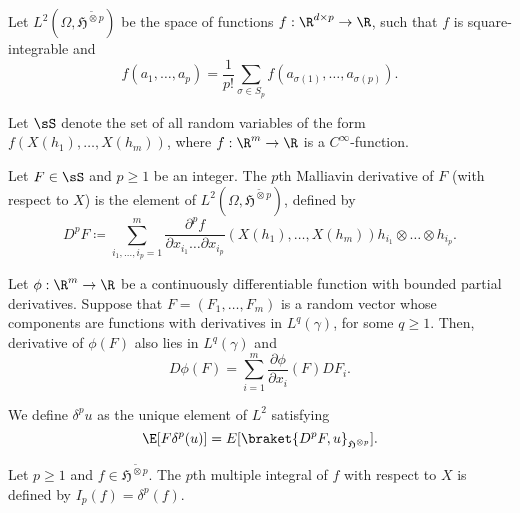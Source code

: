 \begin{definition}
    Let \(L^2(\Omega, \mathfrak{H}^{\tilde \otimes p})\) be the space of functions \(f: \R^{d \times p} \to \R\), such that \(f\) is square-integrable and
    \begin{equation}
        f(a_1, \ldots, a_p) = \frac{1}{p!} \sum_{\sigma \in S_p} f(a_{\sigma(1)}, \ldots, a_{\sigma(p)}).
    \end{equation}
\end{definition}
Let \(\sS\) denote the set of all random variables of the form \(f(X(h_1), \ldots, X(h_m))\),
where \(f: \R^{m} \to \R\) is a \(C^{\infty}\)-function. 
\begin{definition}
    Let \(F \in \sS\) and \(p \geq 1\) be an integer. The \(p\)th Malliavin derivative of \(F\) (with respect to \(X\))
    is the element of \(L^2(\Omega, \mathfrak{H}^{\tilde \otimes p})\), defined by
    \begin{equation}
        D^p F \coloneqq \sum_{i_1, \ldots, i_p = 1}^{m} \frac{\partial^p f}{\partial x_{i_1} \ldots \partial x_{i_p}} (X(h_1), \ldots, X(h_m)) h_{i_1} \otimes \ldots \otimes h_{i_p}.
    \end{equation}
\end{definition}
\begin{proposition}
    Let \(\phi: \R^m \to \R\) be a continuously differentiable function with bounded partial derivatives.
    Suppose that \(F = (F_1, \ldots, F_m)\) is a random vector whose components are functions with derivatives in \(L^q(\gamma)\), for some \(q \geq 1\).
    Then, derivative of \(\phi(F)\) also lies in \(L^q(\gamma)\) and
    \begin{equation}
        D \phi(F) = \sum_{i = 1}^m \frac{\partial \phi}{\partial x_i}(F) D F_i.
    \end{equation}
\end{proposition}
\begin{definition}
We define $\delta^p u$ as the unique element of $L^2$ satisfying 
\[\E[F\delta^p(u)]= E[\braket{D^p F,u}_{\mathfrak H^{\otimes p}}].\]
\end{definition}
\begin{definition}
    Let \(p \geq 1\) and \(f \in \mathfrak{H}^{\tilde \otimes p}\). The \(p\)th multiple integral of \(f\) with respect to \(X\) is defined by
    \(I_p(f) = \delta^p(f)\).
\end{definition}
